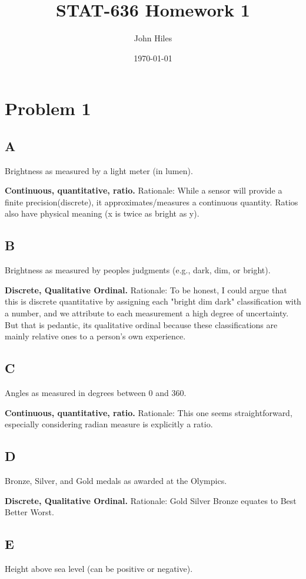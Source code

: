 \documentclass{article}
\title{STAT-636 Homework 1}
\author{John Hiles}
\date\today
\begin{document}
\maketitle %

\section*{Problem 1}
\subsection*{A}
Brightness as measured by a light meter (in lumen).

\textbf{Continuous, quantitative, ratio.}
Rationale: While a sensor will provide a finite precision(discrete), it approximates/measures a continuous quantity. Ratios also have physical meaning (x is twice as bright as y).
\subsection*{B}
Brightness as measured by peoples judgments (e.g., dark, dim, or bright).

\textbf{Discrete, Qualitative Ordinal.}
Rationale: To be honest, I could argue that this is discrete quantitative by assigning each "bright dim dark" classification with a number, and we attribute to each measurement a high degree of uncertainty. But that is pedantic, its qualitative ordinal because these classifications are mainly relative ones to a person's own experience.
\subsection*{C}
Angles as measured in degrees between 0 and 360.

\textbf{Continuous, quantitative, ratio.}
Rationale: This one seems straightforward, especially considering radian measure is explicitly a ratio.
\subsection*{D}
Bronze, Silver, and Gold medals as awarded at the Olympics.

\textbf{Discrete, Qualitative Ordinal.}
Rationale: Gold Silver Bronze equates to Best Better Worst.
\subsection*{E}
Height above sea level (can be positive or negative).
\end{document}
